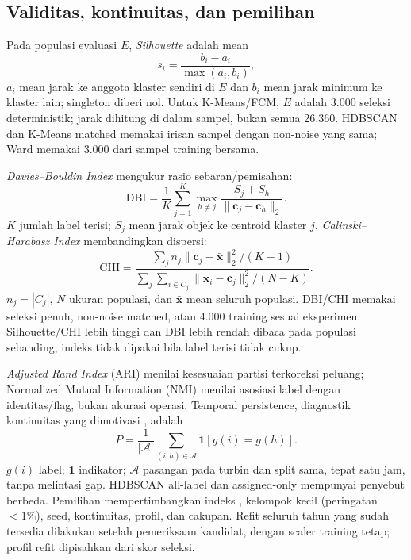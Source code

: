 \subsection{Validitas, kontinuitas, dan pemilihan}
Pada populasi evaluasi $E$, \textit{Silhouette} adalah mean
\begin{equation}
s_i=\frac{b_i-a_i}{\max(a_i,b_i)},
\label{eq:silhouette}
\end{equation}
$a_i$ mean jarak ke anggota klaster sendiri di $E$ dan $b_i$ mean jarak minimum ke klaster lain; singleton diberi nol. Untuk K-Means/FCM, $E$ adalah 3.000 seleksi deterministik; jarak dihitung di dalam sampel, bukan semua 26.360. HDBSCAN dan K-Means matched memakai irisan sampel dengan non-noise yang sama; Ward memakai 3.000 dari sampel training bersama.

\textit{Davies--Bouldin Index} mengukur rasio sebaran/pemisahan:
\begin{equation}
\mathrm{DBI}=\frac{1}{K}\sum_{j=1}^{K}\max_{h\ne j}\frac{S_j+S_h}{\|\mathbf c_j-\mathbf c_h\|_2}.
\label{eq:dbi}
\end{equation}
$K$ jumlah label terisi; $S_j$ mean jarak objek ke centroid klaster $j$. \textit{Calinski--Harabasz Index} membandingkan dispersi:
\begin{equation}
\mathrm{CHI}=\frac{\sum_j n_j\|\mathbf c_j-\bar{\mathbf x}\|_2^2/(K-1)}{\sum_j\sum_{i\in C_j}\|\mathbf x_i-\mathbf c_j\|_2^2/(N-K)}.
\label{eq:chi}
\end{equation}
$n_j=|C_j|$, $N$ ukuran populasi, dan $\bar{\mathbf x}$ mean seluruh populasi. DBI/CHI memakai seleksi penuh, non-noise matched, atau 4.000 training sesuai eksperimen. Silhouette/CHI lebih tinggi dan DBI lebih rendah dibaca pada populasi sebanding; indeks tidak dipakai bila label terisi tidak cukup.

\textit{Adjusted Rand Index} (ARI) menilai kesesuaian partisi terkoreksi peluang; Normalized Mutual Information (NMI) menilai asosiasi label dengan identitas/flag, bukan akurasi operasi. Temporal persistence, diagnostik kontinuitas yang dimotivasi \cite{lang2026}, adalah
\begin{equation}
P=\frac{1}{|\mathcal A|}\sum_{(i,h)\in\mathcal A}\mathbf1[g(i)=g(h)].
\label{eq:persistence}
\end{equation}
$g(i)$ label; $\mathbf1$ indikator; $\mathcal A$ pasangan pada turbin dan split sama, tepat satu jam, tanpa melintasi gap. HDBSCAN all-label dan assigned-only mempunyai penyebut berbeda. Pemilihan mempertimbangkan indeks \cite{ngophan2025,li2026}, kelompok kecil (peringatan $<1\%$), seed, kontinuitas, profil, dan cakupan. Refit seluruh tahun yang sudah tersedia dilakukan setelah pemeriksaan kandidat, dengan scaler training tetap; profil refit dipisahkan dari skor seleksi.

